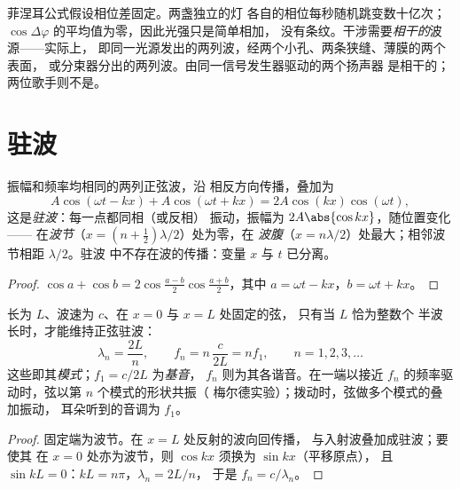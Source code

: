 \begin{remark}[相干性]\label{rem:b1:wave-propagation:coherence}
菲涅耳公式假设相位差固定。两盏独立的灯
各自的相位每秒随机跳变数十亿次；
$\cos\Delta\varphi$ 的平均值为零，因此光强只是简单相加，
没有条纹。干涉需要\emph{相干的}波源——实际上，
即同一光源发出的两列波，经两个小孔、两条狭缝、薄膜的两个表面，
或分束器分出的两列波。由同一信号发生器驱动的两个扬声器
是相干的；两位歌手则不是。
\end{remark}

\section{驻波}

\begin{theorem}[驻波]\label{thm:b1:wave-propagation:standing}
振幅和频率均相同的两列正弦波，沿
相反方向传播，叠加为
\[
A\cos(\omega t - kx) + A\cos(\omega t + kx) = 2A\cos(kx)\cos(\omega t),
\]
这是\emph{驻波}：每一点都同相（或反相）
振动，振幅为 $2A\abs{\cos kx}$，随位置变化——
在\emph{波节}（$x = (n + \tfrac12)\lambda/2$）处为零，在
\emph{波腹}（$x = n\lambda/2$）处最大；相邻波节相距 $\lambda/2$。驻波
中不存在波的传播：变量 $x$ 与 $t$ 已分离。
\end{theorem}

\begin{proof}
$\cos a + \cos b = 2\cos\frac{a - b}{2}\cos\frac{a + b}{2}$，其中
$a = \omega t - kx$，$b = \omega t + kx$。
\end{proof}

\begin{proposition}[两端固定弦的模式]\label{prop:b1:wave-propagation:modes}
长为 $L$、波速为 $c$、在 $x = 0$ 与 $x = L$ 处固定的弦，
只有当 $L$ 恰为整数个
半波长时，才能维持正弦驻波：
\[
\lambda_n = \frac{2L}{n}, \qquad f_n = n\,\frac{c}{2L} = n f_1,
\qquad n = 1, 2, 3, \dots
\]
这些即其\emph{模式}；$f_1 = c/2L$ 为\emph{基音}，
$f_n$ 则为其各谐音。在一端以接近
$f_n$ 的频率驱动时，弦以第 $n$ 个模式的形状共振（
梅尔德实验）；拨动时，弦做多个模式的叠加振动，
耳朵听到的音调为 $f_1$。
\end{proposition}

\begin{proof}
固定端为波节。在 $x = L$ 处反射的波向回传播，
与入射波叠加成驻波；要使其
在 $x = 0$ 处亦为波节，则 $\cos kx$ 须换为 $\sin kx$（平移原点），
且 $\sin kL = 0$：$kL = n\pi$，$\lambda_n = 2L/n$，
于是 $f_n = c/\lambda_n$。
\end{proof}

